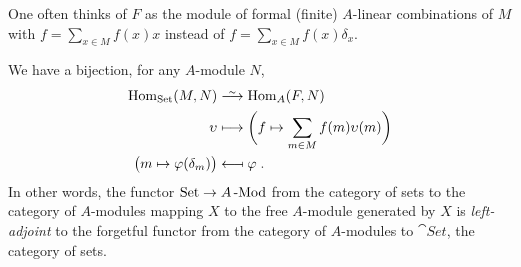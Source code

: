 \documentclass[a4paper,parskip=half,numbers=enddot, DIV=12, headheight=30pt]{scrreprt}
\begin{document}
\begin{rem*}
    \begin{alphanumerate}
        \item  
            One often thinks of $F$ as the module of formal (finite) $A$-linear combinations of $M$ with $f=\sum_{x\in M} f(x) x$ instead of $f= \sum_{x\in M} f(x)\delta_x$.
        \item 
            We have a bijection, for any $A$-module $N$,
            \begin{align*}
                \Hom_{\cat{Set}}(M,N) &\isomorphism \Hom_A(F,N)\\
                \upsilon &\longmapsto \bigg(f\mapsto \sum_{m\in M} f(m) \upsilon(m)\bigg)\\
                \big(m\mapsto \phi(\delta_m) \big) &\longmapsfrom \phi\;.
            \end{align*}
            In other words, the functor $\cat{Set}\morphism A\cat{-Mod}$ from the category of sets to the category of $A$-modules mapping $X$ to the free $A$-module generated by $X$ is \emph{left-adjoint} to the forgetful functor from the category of $A$-modules to $\cat{Set}$, the category of sets.
    \end{alphanumerate}
\end{rem*}
\end{document}
